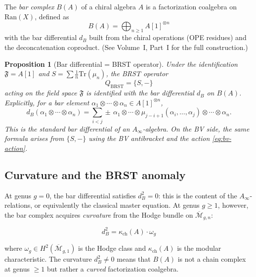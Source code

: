 \documentclass[11pt]{amsart}
\theoremstyle{plain}
\newtheorem{proposition}[theorem]{Proposition}
\theoremstyle{definition}
\theoremstyle{remark}
\newcommand{\Ainf}{A_\infty}
\newcommand{\Tr}{\mathrm{Tr}}
\newcommand{\Ran}{\mathrm{Ran}}
\newcommand{\BRST}{\mathrm{BRST}}
\newcommand{\cM}{\mathcal{M}}
\begin{document}
The \emph{bar complex} $B(A)$ of a chiral algebra $A$ is a factorization coalgebra on $\Ran(X)$, defined as
\[
 B(A) = \bigoplus_{n \geq 1} A[1]^{\otimes n}
\]
with the bar differential $d_B$ built from the chiral operations (OPE residues) and the deconcatenation coproduct. (See Volume~I, Part~I for the full construction.)

\begin{proposition}[Bar differential = BRST operator]
\label{prop:bar-brst}
Under the identification $\mathfrak{F} = A[1]$ and $S = \sum \frac{1}{n}\Tr(\mu_n)$, the BRST operator
\begin{equation}\label{eq:brst}
 Q_{\BRST} = \{S, -\}
\end{equation}
acting on the field space $\mathfrak{F}$ is identified with the bar differential $d_B$ on $B(A)$. Explicitly, for a bar element $\alpha_1 \otimes \cdots \otimes \alpha_n \in A[1]^{\otimes n}$,
\[
 d_B(\alpha_1 \otimes \cdots \otimes \alpha_n) = \sum_{i < j} \pm\, \alpha_1 \otimes \cdots \otimes \mu_{j-i+1}(\alpha_i, \ldots, \alpha_j) \otimes \cdots \otimes \alpha_n.
\]
This is the standard bar differential of an $\Ainf$-algebra. On the BV side, the same formula arises from $\{S, -\}$ using the BV antibracket and the action \eqref{eq:bv-action}.
\end{proposition}

\subsection{Curvature and the BRST anomaly}
\label{subsec:curvature-anomaly}

At genus $g = 0$, the bar differential satisfies $d_B^2 = 0$: this is the content of the $\Ainf$-relations, or equivalently the classical master equation. At genus $g \geq 1$, however, the bar complex acquires \emph{curvature} from the Hodge bundle on $\overline{\cM}_{g,n}$:

\begin{equation}\label{eq:curvature}
 \boxed{
 d_B^2 = \kappa_{\mathrm{ch}}(A) \cdot \omega_g
 }
\end{equation}

where $\omega_g \in H^2(\overline{\cM}_{g,1})$ is the Hodge class and $\kappa_{\mathrm{ch}}(A)$ is the modular characteristic. The curvature $d_B^2 \neq 0$ means that $B(A)$ is not a chain complex at genus $\geq 1$ but rather a \emph{curved} factorization coalgebra.
\end{document}
